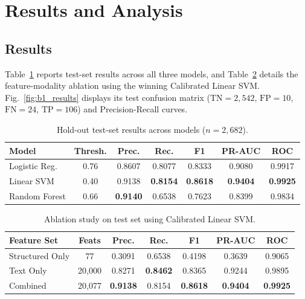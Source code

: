 \documentclass[conference,a4paper]{IEEEtran}
\begin{document}
\section{Results and Analysis}
\subsection{Results}
Table~\ref{tab:b1_results} reports test-set results across all three models, and Table~\ref{tab:b1_ablation} details the feature-modality ablation using the winning Calibrated Linear SVM. Fig.~\ref{fig:b1_results} displays its test confusion matrix ($\text{TN}=2,542$, $\text{FP}=10$, $\text{FN}=24$, $\text{TP}=106$) and Precision-Recall curves.

\begin{table}[htbp]
\centering
\caption{Hold-out test-set results across models ($n = 2,682$).}
\label{tab:b1_results}
\scriptsize
\renewcommand{\arraystretch}{0.92}
\setlength{\tabcolsep}{4pt}
\begin{tabularx}{\columnwidth}{lcccccc}
\toprule
\textbf{Model} & \textbf{Thresh.} & \textbf{Prec.} & \textbf{Rec.} & \textbf{F1} & \textbf{PR-AUC} & \textbf{ROC} \\
\midrule
Logistic Reg. & 0.76 & 0.8607 & 0.8077 & 0.8333 & 0.9080 & 0.9917 \\
Linear SVM & 0.40 & 0.9138 & \textbf{0.8154} & \textbf{0.8618} & \textbf{0.9404} & \textbf{0.9925} \\
Random Forest & 0.66 & \textbf{0.9140} & 0.6538 & 0.7623 & 0.8399 & 0.9834 \\
\bottomrule
\end{tabularx}
\end{table}

\begin{table}[htbp]
\centering
\caption{Ablation study on test set using Calibrated Linear SVM.}
\label{tab:b1_ablation}
\scriptsize
\renewcommand{\arraystretch}{0.92}
\setlength{\tabcolsep}{4pt}
\begin{tabularx}{\columnwidth}{lcccccc}
\toprule
\textbf{Feature Set} & \textbf{Feats} & \textbf{Prec.} & \textbf{Rec.} & \textbf{F1} & \textbf{PR-AUC} & \textbf{ROC} \\
\midrule
Structured Only & 77 & 0.3091 & 0.6538 & 0.4198 & 0.3639 & 0.9065 \\
Text Only & 20,000 & 0.8271 & \textbf{0.8462} & 0.8365 & 0.9244 & 0.9895 \\
Combined & 20,077 & \textbf{0.9138} & 0.8154 & \textbf{0.8618} & \textbf{0.9404} & \textbf{0.9925} \\
\bottomrule
\end{tabularx}
\end{table}
\end{document}
